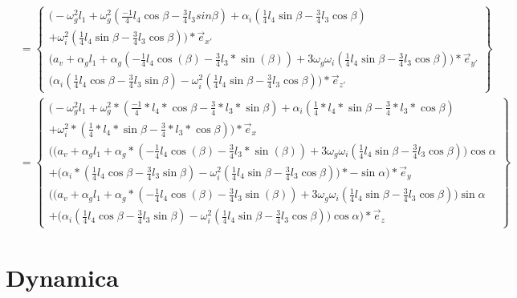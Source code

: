 \documentclass[a4paper,10pt]{article}
\begin{document}
\begin{equation}
\begin{aligned}
&=\begin{Bmatrix}
\Big( -\omega^{2}_g l_1 +\omega_{g}^{2}  (\frac{-1}{4} l_4 \cos{\beta}-\frac{3}{4} l_3 sin{\beta})+\alpha_i(\frac{1}{4} l_4 \sin{\beta}-\frac{3}{4} l_3 \cos{\beta})\\ + \omega_i^2 (\frac{1}{4} l_4 \sin{\beta}-\frac{3}{4} l_3  \cos{\beta}) \Big)* \vec{e}_{x'}\\
\Big(a_v +\alpha_g l_1 +\alpha_g ({-\frac{1}{4}} l_4 \cos(\beta)-\frac{3}{4}l_3*\sin(\beta)) + 3\omega_g\omega_i(\frac{1}{4}l_4 \sin{\beta}-\frac{3}{4}l_3  \cos{\beta})\Big)*\vec{e}_{y'}\\
\Big(\alpha_i (\frac{1}{4} l_4 \cos{\beta} - \frac{3}{4} l_3  \sin{\beta}) - \omega_i^2(\frac{1}{4} l_4 \sin{\beta} - \frac{3}{4} l_3 \cos{\beta})\Big)*\vec{e}_{z'}
\end{Bmatrix}\\
&= \begin{Bmatrix}
\Big( -\omega^{2}_g l_1 +\omega_{g}^{2} * (\frac{-1}{4}*l_4*\cos{\beta}-\frac{3}{4}*l_3*\sin{\beta})+\alpha_i(\frac{1}{4}*l_4 *\sin{\beta}-\frac{3}{4}*l_3 * \cos{\beta})\\ + \omega_i^2*(\frac{1}{4}*l_4 *\sin{\beta}-\frac{3}{4}*l_3 * \cos{\beta}) \Big)* \vec{e}_{x}\\
\Bigg(\Big(a_v +\alpha_g l_1 +\alpha_g *({-\frac{1}{4}}  l_4 \cos(\beta)-\frac{3}{4}l_3*\sin(\beta)) + 3\omega_g\omega_i(\frac{1}{4}l_4 \sin{\beta}-\frac{3}{4}l_3  \cos{\beta})\Big)\cos{\alpha}\\ + \Big(\alpha_i * (\frac{1}{4} l_4 \cos{\beta} - \frac{3}{4} l_3 \sin{\beta}) - \omega_i^2(\frac{1}{4} l_4 \sin{\beta}-\frac{3}{4} l_3  \cos{\beta})\Big)*-\sin{\alpha}\Bigg)*\vec{e}_{y}\\
\Bigg(\Big(a_v +\alpha_g l_1 +\alpha_g *({-\frac{1}{4}}  l_4 \cos(\beta)-\frac{3}{4}l_3 \sin(\beta)) + 3\omega_g\omega_i(\frac{1}{4}l_4 \sin{\beta}-\frac{3}{4}l_3  \cos{\beta})\Big)\sin{\alpha}\\ + \Big(\alpha_i (\frac{1}{4} l_4 \cos{\beta} - \frac{3}{4} l_3 \sin{\beta}) - \omega_i^2(\frac{1}{4} l_4 \sin{\beta}-\frac{3}{4} l_3   \cos{\beta})\Big) \cos{\alpha}\Bigg)*\vec{e}_{z}
\end{Bmatrix}
\end{aligned}
\end{equation}
\section{Dynamica}
\end{document}
